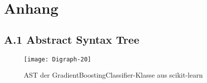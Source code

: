 \documentclass[german,bachelor]{swsLeipzig}
\begin{document}

\appendix
\chapter*{Anhang}
\section*{A.1 Abstract Syntax Tree}
\renewcommand{\thefigure}{A.1}
\begin{figure}[h]
 \centering
 \texttt{[image: Digraph-20]}
 \caption{AST der GradientBoostingClassifier-Klasse aus scikit-learn}
 \label{fig:asdt}
\end{figure}
\


\end{document}
